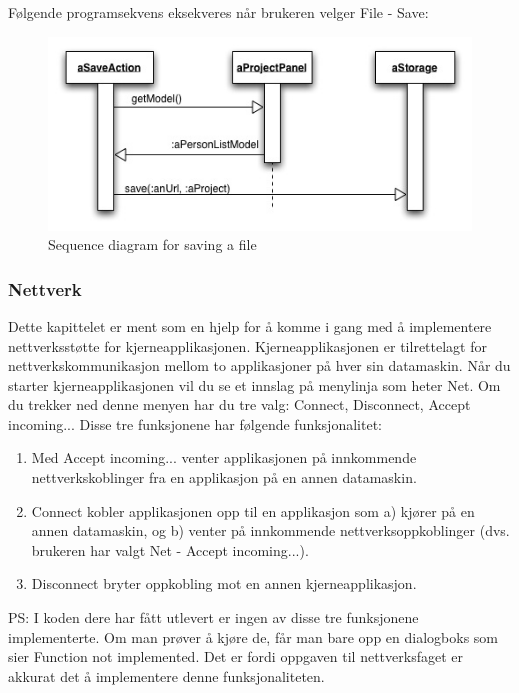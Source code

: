 Følgende programsekvens eksekveres når brukeren velger File - Save:

\begin{figure}[H]
    \centering
    \includegraphics[width=\textwidth]{resources/sequence-save-file.jpg}
    \caption{Sequence diagram for saving a file}
    \label{fig:sequence-save-file}
\end{figure}

\subsubsection{Nettverk}

Dette kapittelet er ment som en hjelp for å komme i gang med å implementere nettverksstøtte for kjerneapplikasjonen. Kjerneapplikasjonen er tilrettelagt for nettverkskommunikasjon mellom to applikasjoner på hver sin datamaskin. Når du starter kjerneapplikasjonen vil du se et innslag på menylinja som heter Net. Om du trekker ned denne menyen har du tre valg: Connect, Disconnect, Accept incoming... Disse tre funksjonene har følgende funksjonalitet:

\begin{enumerate}

\item
Med Accept incoming... venter applikasjonen på innkommende nettverkskoblinger fra en applikasjon på en annen datamaskin.

\item
Connect kobler applikasjonen opp til en applikasjon som a) kjører på en annen datamaskin, og b) venter på innkommende nettverksoppkoblinger (dvs. brukeren har valgt Net - Accept incoming...). 

\item
Disconnect bryter oppkobling mot en annen kjerneapplikasjon.

\end{enumerate}

PS: I koden dere har fått utlevert er ingen av disse tre funksjonene implementerte. Om man prøver å kjøre de, får man bare opp en dialogboks som sier Function not implemented. Det er fordi oppgaven til nettverksfaget er akkurat det å implementere denne funksjonaliteten.

